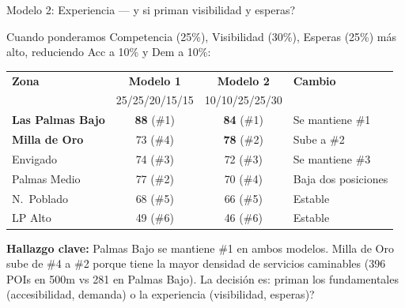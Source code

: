 \documentclass[aspectratio=169, 11pt]{beamer}
\begin{document}
\begin{frame}{Modelo 2: Experiencia --- \textquestiondown y si priman visibilidad y esperas?}

\vspace{2pt}
{\scriptsize Cuando ponderamos \textcolor{comp}{Competencia (25\%)}, \textcolor{vis}{Visibilidad (30\%)}, \textcolor{esp}{Esperas (25\%)} m\'{a}s alto, reduciendo Acc a 10\% y Dem a 10\%:}

\vspace{6pt}
\begin{center}
{\scriptsize
\begin{tabular}{@{}l cc | l@{}}
\toprule
\textbf{Zona} & \textbf{Modelo 1} & \textbf{Modelo 2} & \textbf{Cambio} \\
& {\tiny 25/25/20/15/15} & {\tiny 10/10/25/25/30} & \\
\midrule
\rowcolor{acc!12}
\textbf{Las Palmas Bajo} & \textcolor{acc}{\textbf{88}} (\#1) & \textcolor{acc}{\textbf{84}} (\#1) & Se mantiene \#1 \\[2pt]
\textbf{Milla de Oro} & 73 (\#4) & \textbf{78} (\#2) & Sube a \#2 \\[2pt]
\rowcolor{bglight}
Envigado & 74 (\#3) & 72 (\#3) & Se mantiene \#3 \\[2pt]
Palmas Medio & 77 (\#2) & 70 (\#4) & Baja dos posiciones \\[2pt]
\rowcolor{bglight}
N.\ Poblado & 68 (\#5) & 66 (\#5) & Estable \\[2pt]
LP Alto & 49 (\#6) & 46 (\#6) & Estable \\
\bottomrule
\end{tabular}
}
\end{center}

\vspace{6pt}
{\scriptsize\textbf{Hallazgo clave:} Palmas Bajo se mantiene \#1 en ambos modelos. Milla de Oro sube de \#4 a \#2 porque tiene la mayor densidad de servicios caminables (396 POIs en 500m vs 281 en Palmas Bajo). La decisi\'{o}n es: \textquestiondown priman los fundamentales (accesibilidad, demanda) o la experiencia (visibilidad, esperas)?}
\end{frame}
\end{document}
